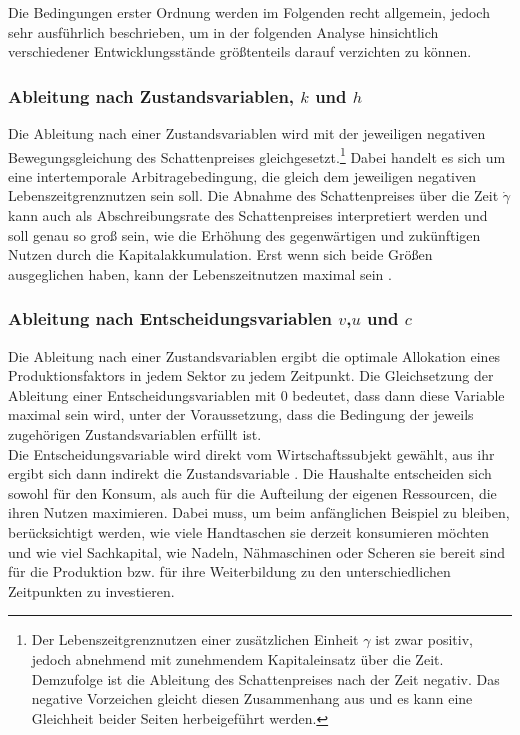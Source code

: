 %
Die Bedingungen erster Ordnung werden im Folgenden recht allgemein, jedoch sehr ausführlich beschrieben, um in der folgenden Analyse hinsichtlich verschiedener Entwicklungsstände größtenteils darauf verzichten zu können. 
\subsubsection*{Ableitung nach Zustandsvariablen, $k$ und $h$}
Die Ableitung nach einer Zustandsvariablen wird mit der jeweiligen negativen Bewegungsgleichung des Schattenpreises gleichgesetzt.\footnote{Der Lebenszeitgrenznutzen einer zusätzlichen Einheit $\gamma$ ist zwar positiv, jedoch abnehmend mit zunehmendem Kapitaleinsatz über die Zeit. Demzufolge ist die Ableitung des Schattenpreises nach der Zeit negativ. Das negative Vorzeichen gleicht diesen Zusammenhang aus und es kann eine Gleichheit beider Seiten herbeigeführt werden.} Dabei handelt es sich um eine intertemporale Arbitragebedingung, die gleich dem jeweiligen negativen Lebenszeitgrenznutzen sein soll. Die Abnahme des Schattenpreises über die Zeit $\dot{\gamma}$ kann auch als Abschreibungsrate des Schattenpreises interpretiert werden und soll genau so groß sein, wie die Erhöhung des gegenwärtigen und zukünftigen Nutzen durch die Kapitalakkumulation. Erst wenn sich beide Größen ausgeglichen haben, kann der Lebenszeitnutzen maximal sein \cite{Chiang.2000,Chiang.2011}.
%
\subsubsection*{Ableitung nach Entscheidungsvariablen $v$,$u$ und $c$ }
Die Ableitung nach einer Zustandsvariablen ergibt die optimale Allokation eines Produktionsfaktors in jedem Sektor zu jedem Zeitpunkt. Die Gleichsetzung der Ableitung einer Entscheidungsvariablen mit $0$ bedeutet, dass dann diese Variable maximal sein wird, unter der Voraussetzung, dass die Bedingung der jeweils zugehörigen Zustandsvariablen erfüllt ist.\\
%
Die Entscheidungsvariable wird direkt vom Wirtschaftssubjekt gewählt, aus ihr ergibt sich dann indirekt die Zustandsvariable \cite{Chiang.2011}. Die Haushalte entscheiden sich sowohl für den Konsum, als auch für die Aufteilung der eigenen Ressourcen, die ihren Nutzen maximieren. Dabei muss, um beim anfänglichen Beispiel zu bleiben, berücksichtigt werden, wie viele Handtaschen sie derzeit konsumieren möchten und wie viel Sachkapital, wie Nadeln, Nähmaschinen oder Scheren  sie bereit sind für die Produktion bzw. für ihre Weiterbildung zu den unterschiedlichen Zeitpunkten zu investieren. 
%

